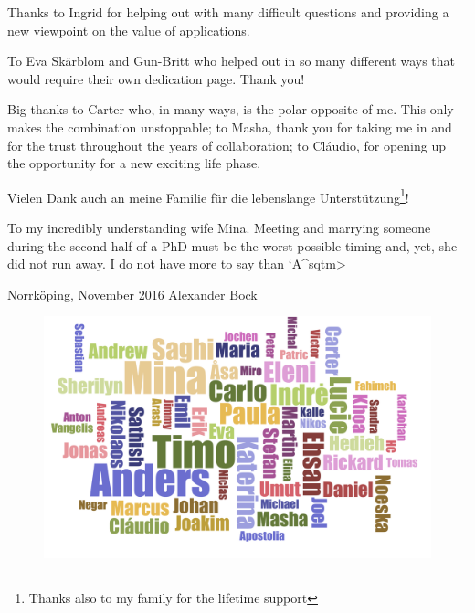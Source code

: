 Thanks to Ingrid for helping out with many difficult questions and providing a new viewpoint on the value of applications.

To Eva Sk\"arblom and Gun-Britt who helped out in so many different ways that would require their own dedication page. Thank you!

Big thanks to Carter who, in many ways, is the polar opposite of me. This only makes the combination unstoppable; to Masha, thank you for taking me in and for the trust throughout the years of collaboration; to Cl\'audio, for opening up the opportunity for a new exciting life phase.

Vielen Dank auch an meine Familie f\"ur die lebenslange Unterst\"utzung\footnote{Thanks also to my family for the lifetime support}!

To my incredibly understanding wife Mina. Meeting and marrying someone during the second half of a PhD must be the worst possible timing and, yet, she did not run away. I do not have more to say than \<`A^sqtm>

\vspace{1cm}
\hline \hline

Norrk\"oping, November 2016 \hfill Alexander Bock

\vfill

\begin{figure}[hb]
\centering
\includegraphics[width=\linewidth]{figures/misc/wordcloud.pdf}
\end{figure}

